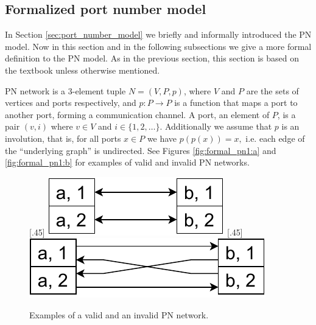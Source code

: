 \subsection{Formalized port number model}
In Section \ref{sec:port_number_model} we briefly and informally introduced the PN model.
Now in this section and in the following subsections we give a more formal definition to the PN model.
As in the previous section, this section is based on the textbook \cite{HirvonenSuomelaDistAlg2020} unless otherwise mentioned.

PN network is a 3-element tuple $N = (V, P, p)$, where $V$ and $P$ are the sets of vertices and ports respectively, and $p\colon P \rightarrow P$ is a function that maps a port to another port, forming a communication channel.
A port, an element of $P$, is a pair $(v, i)$ where $v \in V$ and $i \in \{1, 2, \dotsc\}$.
Additionally we assume that $p$ is an involution, that is, for all ports $x \in P$ we have $p(p(x)) = x, $ i.e. each edge of the ``underlying graph'' is undirected.
See Figures \ref{fig:formal_pn1:a} and \ref{fig:formal_pn1:b} for examples of valid and invalid PN networks.

\begin{figure}[H]
    [.45\linewidth] {
    \centering
    \includegraphics[scale=0.6]{diagrams/formalizing_pn_network_diagram1.pdf}
  }
  \hfill
    [.45\linewidth] {
    \centering
    \includegraphics[scale=0.6]{diagrams/formalizing_pn_network_diagram2.pdf}
  }
  \caption{Examples of a valid and an invalid PN network.}
  \label{fig:formal_pn1}
\end{figure}


